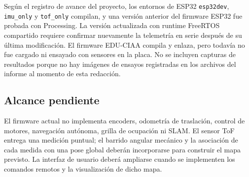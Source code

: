 Según el registro de avance del proyecto, los entornos de ESP32
\texttt{esp32dev}, \texttt{imu\_only} y \texttt{tof\_only} compilan, y una
versión anterior del firmware ESP32 fue probada con Processing. La versión
actualizada con runtime FreeRTOS compartido requiere confirmar nuevamente la
telemetría en serie después de su última modificación. El firmware EDU-CIAA
compila y enlaza, pero todavía no fue cargado ni ensayado con sensores en la
placa. No se incluyen capturas de resultados porque no hay imágenes de ensayos
registradas en los archivos del informe al momento de esta redacción.

\subsection{Alcance pendiente}

El firmware actual no implementa encoders, odometría de traslación, control de
motores, navegación autónoma, grilla de ocupación ni SLAM. El sensor ToF entrega
una medición puntual; el barrido angular mecánico y la asociación de cada medida
con una pose global deberán incorporarse para construir el mapa previsto. La
interfaz de usuario deberá ampliarse cuando se implementen los comandos remotos
y la visualización de dicho mapa.
